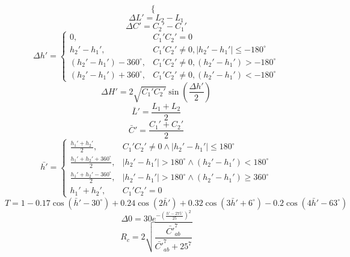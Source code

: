 \begin{appendices}
\begin{equation}
\begin{cases}
\end{cases}
\end{equation}
\begin{equation}
\Delta L'=L_{2}-L_{1}
\end{equation}
\begin{equation}
\Delta C'=C_{2}'-C_{1}'
\end{equation}
\begin{equation}
\Delta h' =
\begin{cases}
0, & C_{1}'C_{2}'=0\\
h_{2}'-h_{1}', & C_{1}'C_{2}'\ne 0, |h_{2}'-h_{1}'| \leq -180^{\circ}\\
(h_{2}'-h_{1}')-360^{\circ}, & C_{1}'C_{2}'\neq 0, (h_{2}'-h_{1}') > -180^{\circ}\\
(h_{2}'-h_{1}')+360^{\circ}, & C_{1}'C_{2}'\neq 0, (h_{2}'-h_{1}') < -180^{\circ}
\end{cases}
\end{equation}
\begin{equation}
\Delta H'=2\sqrt{C_{1}'C_{2}' } \sin\left(\frac{\Delta h'}{2}\right)
\end{equation}
\begin{equation}
\bar{L}'=\frac{L_{1}+L_{2}}{2}
\end{equation}
\begin{equation}
\bar{C}'=\frac{C_{1}'+C_{2}'}{2}
\end{equation}
\begin{equation}
\bar{h'} =
\begin{cases}
\frac{h_{1}'+h_{2}'}{2}, & C_{1}'C_{2}'\neq 0 \wedge |h_{2}'-h_{1}'| \leq 180^{\circ}\\
\frac{h_{1}'+h_{2}'+360^{\circ}}{2}, & |h_{2}'-h_{1}'| > 180^{\circ} \wedge (h_{2}'-h_{1}') < 180^{\circ}\\
\frac{h_{1}'+h_{2}'-360^{\circ}}{2}, & |h_{2}'-h_{1}'| > 180^{\circ} \wedge (h_{2}'-h_{1}') \geq 360^{\circ}\\
h_{1}'+h_{2}', & C_{1}'C_{2}'=0
\end{cases}
\end{equation}
\begin{equation}
T=1-0.17 \cos(\bar{h}'-30^{\circ})+0.24 \cos(2\bar{h}')+0.32\cos(3\bar{h}'+6^{\circ})-0.2 \cos(4\bar{h}'-63^{\circ})
\end{equation}
\begin{equation}
\Delta 0 = 30e^{-(\frac{h'-275^{\circ}}{25})^{2}}
\end{equation} 
\begin{equation}
R_{c}=2\sqrt{\frac{\bar{C'}_{ab}^{7}}{\bar{C'}_{ab}^{7}+25^{7}}}

\end{equation}
\end{appendices}
